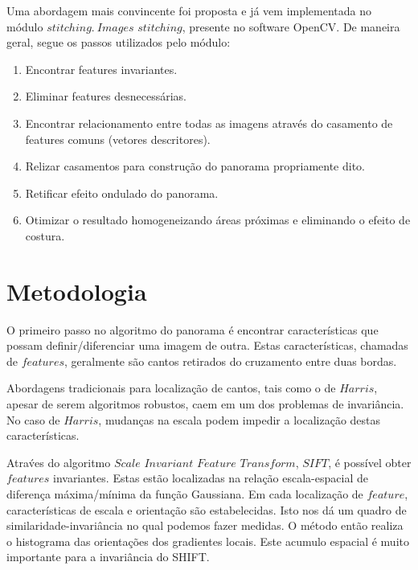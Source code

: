 \documentclass[conference]{IEEEtran}
\begin{document}
Uma abordagem mais convincente foi proposta e j\'a vem implementada no m\'odulo $stitching.\> Images$ $stitching$, presente
no software OpenCV. De maneira geral, segue os passos utilizados pelo m\'odulo:
  \\
\begin{enumerate}  
  \item Encontrar features invariantes.
  \item Eliminar features desnecess\'arias.
  \item Encontrar relacionamento entre todas as imagens atrav\'es do casamento de features comuns (vetores descritores).
  \item Relizar casamentos para constru\c{c}\~ao do panorama propriamente dito.
  \item Retificar efeito ondulado do panorama.
  \item Otimizar o resultado homogeneizando \'areas pr\'oximas e eliminando o efeito de costura.

\end{enumerate}	 
     
\section{Metodologia} 
\label{sec:meth} 
     
     O primeiro passo no algoritmo do panorama \'e encontrar caracter\'isticas que possam definir/diferenciar uma imagem de 
     outra. Estas caracter\'isticas, chamadas de $features$, geralmente s\~ao cantos retirados do cruzamento entre duas bordas.
     
     Abordagens tradicionais para localiza\c{c}\~ao de cantos, tais como o de $Harris$, apesar de serem algoritmos robustos, 
     caem em um dos problemas de invari\^ancia. No caso de $Harris$, mudan\c{c}as
     na escala podem impedir a localiza\c{c}\~ao destas caracter\'isticas.
     
     Atra\'ves do algoritmo $Scale$ $Invariant$ $Feature$ $Transform$, $SIFT$, \'e poss\'ivel obter $features$ invariantes.
     Estas est\~ao localizadas na rela\c{c}\~ao escala-espacial de diferen\c{c}a m\'axima/m\'inima da fun\c{c}\~ao Gaussiana.
     Em cada localiza\c{c}\~ao de $feature$, caracter\'isticas de escala e orienta\c{c}\~ao s\~ao estabelecidas. Isto nos d\'a
     um quadro de similaridade-invari\^ancia no qual podemos fazer medidas. O m\'etodo ent\~ao realiza o histograma das orienta\c{c}\~oes
     dos gradientes locais. Este acumulo espacial \'e muito importante para a invari\^ancia do SHIFT.
     
\end{document}
